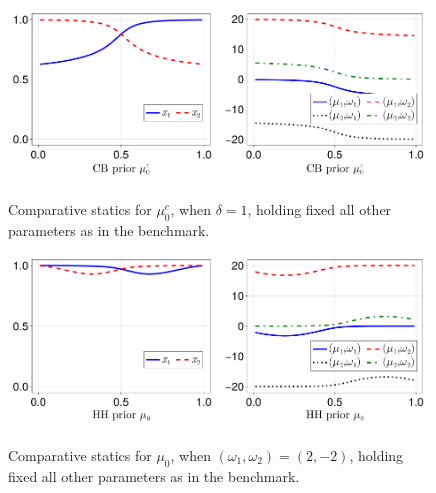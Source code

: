 \documentclass[12pt,a4paper]{article}
\begin{document}
\begin{figure}[H]
\centering
\includegraphics[width=0.49\textwidth]{figures/V8/γ_10/fig_optimal_π_across_μ_0_c_ω_1_1_ω_2_-1_δ_1.0_.pdf}
\includegraphics[width=0.49\textwidth]{figures/V8/γ_10/fig_posterior_across_μ_0_c_ω_1_1_ω_2_-1_δ_1.0_.pdf}
\caption{Comparative statics for $\mu_0^c$, when $\delta=1$, holding fixed all other parameters as in the benchmark.}
\label{FigureA4}
\end{figure}

\begin{figure}[H]
\centering
\includegraphics[width=0.49\textwidth]{figures/V8/γ_10/fig_optimal_π_across_μ_0_ω_1_2_ω_2_-2_δ_0.5_.pdf}
\includegraphics[width=0.49\textwidth]{figures/V8/γ_10/fig_posterior_across_μ_0_ω_1_2_ω_2_-2_δ_0.5_.pdf}
\caption{Comparative statics for $\mu_0$, when $(\omega_1,\omega_2)=(2,-2)$, holding fixed all other parameters as in the benchmark.}
\label{FigureA5}
\end{figure}
\end{document}

